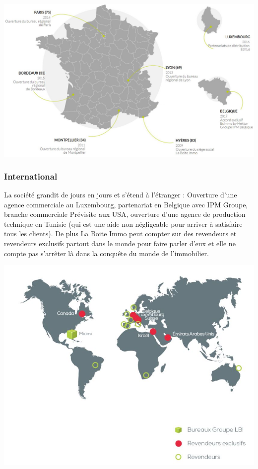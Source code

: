\documentclass[12pt]{article}
\begin{document}
\begin{center} \includegraphics[scale = 0.4]{Map.JPG} \end{center}

\newpage

\subsubsection{International}

La société grandit de jours en jours et s'étend à l'étranger : Ouverture d'une agence commerciale au Luxembourg, partenariat en Belgique avec IPM Groupe, branche commerciale Prévisite aux USA, ouverture d'une agence de production technique en Tunisie (qui est une aide non négligeable pour arriver à satisfaire tous les clients). De plus La Boite Immo peut compter sur des revendeurs et revendeurs exclusifs partout dans le monde pour faire parler d'eux et elle ne compte pas s'arrêter là dans la conquête du monde de l'immobilier. 

\vspace{0.5cm}

\begin{center} \includegraphics[scale = 0.7]{ImplantationMondiale.JPG} \end{center}
\end{document}
